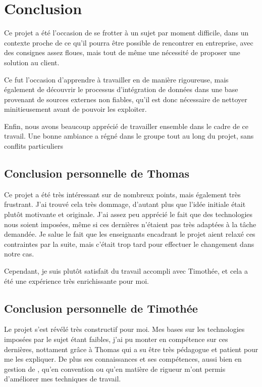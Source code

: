 \documentclass[a4paper, 11pt, twoside]{book}
\begin{document}
\chapter*{Conclusion}

Ce projet a été l'occasion de se frotter à un sujet par moment difficile, dans un contexte proche de ce qu'il pourra être possible de rencontrer en entreprise, avec des consignes assez floues, mais tout de même une nécessité de proposer une solution au client.

Ce fut l'occasion d'apprendre à travailler en  de manière rigoureuse, mais également de découvrir le processus d'intégration de données dans une base provenant de sources externes non fiables, qu'il est donc nécessaire de nettoyer minitieusement avant de pouvoir les exploiter.

Enfin, nous avons beaucoup apprécié de travailler ensemble dans le cadre de ce travail. Une bonne ambiance a régné dans le groupe tout au long du projet, sans conflits particuliers

\section*{Conclusion personnelle de Thomas}

Ce projet a été très intéressant sur de nombreux points, mais également très frustrant. J'ai trouvé cela très dommage, d'autant plus que l'idée initiale était plutôt motivante et originale.  J'ai assez peu apprécié le fait que des technologies nous soient imposées, même si ces dernières n'étaient pas très adaptées à la tâche demandée. Je salue le fait que les enseignants encadrant le projet aient relaxé ces contraintes par la suite, mais c'était trop tard pour effectuer le changement dans notre cas.

Cependant, je suis plutôt satisfait du travail accompli avec Timothée, et cela a été une expérience très enrichissante pour moi.

\section*{Conclusion personnelle de Timothée}

Le projet s'est révélé très constructif pour moi. Mes bases sur les technologies imposées par le sujet étant faibles, j'ai pu monter en compétence sur ces dernières, nottament grâce à Thomas qui a su être très pédagogue et patient pour me les expliquer. De plus ses connaissances et ses compétences, aussi bien en gestion de , qu'en convention ou qu'en matière de rigueur m'ont permis d'améliorer mes techniques de travail.
\end{document}
